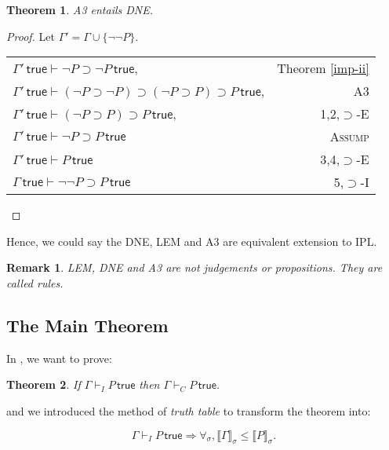 \documentclass{article}
\newcounter{rowcount}
\newtheorem{theorem}{Theorem}[section]
\newtheorem*{remark}{Remark}
\newcommand{\true}{\,\textsf{true}}
\newcommand{\brs}[1]{\llbracket#1\rrbracket_\sigma}
\begin{document}
\setcounter{rowcount}{0}
\begin{theorem}
    \emph{A3} entails \emph{DNE}.
\end{theorem}
\begin{proof}
    Let $\Gamma' = \Gamma \cup \{\neg\neg P\}$.

    \begin{tabular}{@{\stepcounter{rowcount}\therowcount. }lr}
        $\Gamma' \true \vdash \neg P \supset \neg P\true$,                                        & Theorem \ref{imp-ii} \\
        $\Gamma' \true \vdash (\neg P \supset \neg P) \supset (\neg P \supset P)\supset P\true $, & A3                   \\
        $\Gamma' \true \vdash (\neg P \supset P)\supset P\true $,                                 & 1,2,$\supset$-E      \\
        $\Gamma' \true \vdash \neg P\supset P \true$                                              & \textsc{Assump}      \\
        $\Gamma' \true \vdash P \true$                                                            & 3,4,$\supset$-E      \\
        $\Gamma \true \vdash \neg\neg P \supset P \true$                                          & 5,$\supset$-I        \\
    \end{tabular}
\end{proof}

Hence, we could say the DNE, LEM and A3 are equivalent extension to IPL.

\begin{remark}
    LEM, DNE and A3 are not judgements or propositions. They are called \emph{rules}.
\end{remark}

\subsection{The Main Theorem}

In \cite{int}, we want to prove:

\begin{theorem}
    If $\Gamma \vdash_{I} P \true$ then $\Gamma \vdash_{C} P \true$.
\end{theorem}

and we introduced the method of \emph{truth table} to transform the theorem into:

\[
    \Gamma \vdash_{I} P \true \Rightarrow \forall_\sigma, \brs{\Gamma} \leq \brs{P}.
\]
\end{document}
